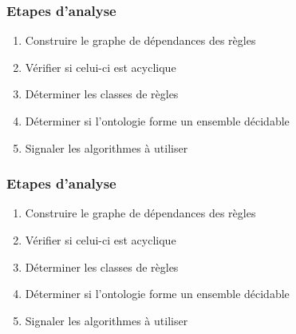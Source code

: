 
\begin{frame}
	\frametitle{Etapes d'analyse}
	\begin{enumerate}
		\item Construire le graphe de dépendances des règles
		\item Vérifier si celui-ci est acyclique
		\item Déterminer les classes de règles 
		\item Déterminer si l'ontologie forme un ensemble décidable
		\item Signaler les algorithmes à utiliser
	\end{enumerate}
\end{frame}


\begin{frame}
	\frametitle{Etapes d'analyse}
	\begin{enumerate}
		\item Construire le graphe de dépendances des règles
		\item Vérifier si celui-ci est acyclique
		\item Déterminer les classes de règles
		\item Déterminer si l'ontologie forme un ensemble décidable
		\item Signaler les algorithmes à utiliser
	\end{enumerate}
\end{frame}


